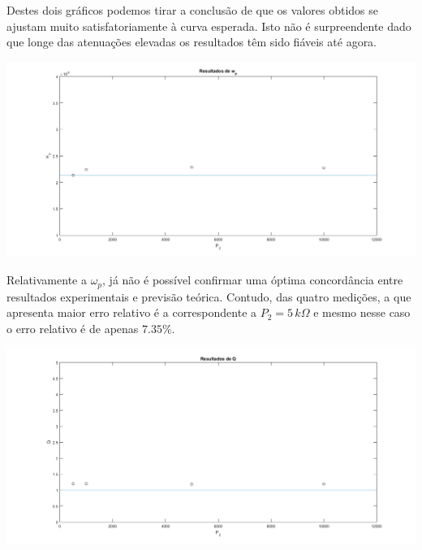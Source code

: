 \documentclass[a4paper,11pt]{report}
\begin{document}
     Destes dois gráficos podemos tirar a conclusão de que os valores obtidos se ajustam muito satisfatoriamente à curva esperada. Isto não é surpreendente dado que longe das atenuações elevadas os resultados têm sido fiáveis até agora.

\begin{center}
     \includegraphics[angle=0,width=1\textwidth]{RelacaowpP2TT.png}
     \label{fig:RelacaowpP2TT}
     \end{center}

Relativamente a $\omega_p$, já não é possível confirmar uma óptima concordância entre resultados experimentais e previsão teórica. Contudo, das quatro medições, a que apresenta maior erro relativo é a correspondente a $P_2=5\, k\Omega$ e mesmo nesse caso o erro relativo é de apenas $7.35\%$.

\begin{center}
     \includegraphics[angle=0,width=1\textwidth]{RelacaoQP2TT.png}
     \label{fig:RelacaoQP2TT}
     \end{center}
\end{document}
